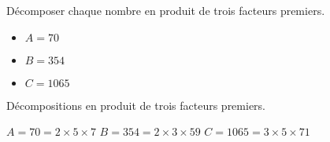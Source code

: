 \begin{exercice*}
    \label{N2exosBase013}
    Décomposer chaque nombre en produit de trois facteurs premiers.
    \begin{itemize}
        \item[] $A=70$
        \item[] $B=354$
        \item[] $C=\num{1065}$
    \end{itemize}

\end{exercice*}
\begin{corrige}
    Décompositions en produit de trois facteurs premiers.
    
    \begin{itemize}
        \def\item{}
        \item $A=70=2\times 5\times 7$
        \item $B=354=2\times 3\times 59$
        \item $C=\num{1065}=3\times 5\times 71$
    \end{itemize} 
\end{corrige}

